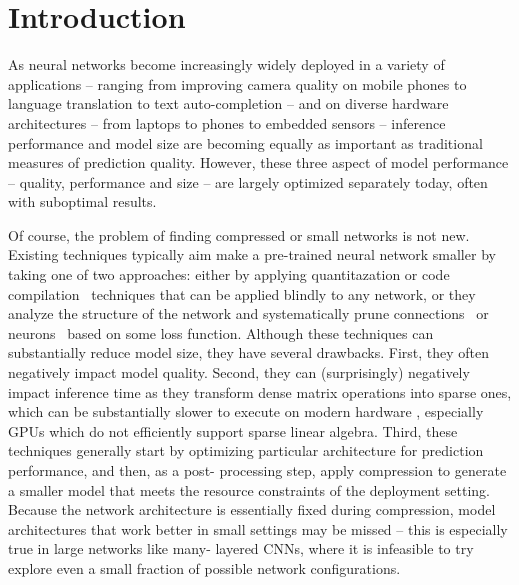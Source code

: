 
\section{Introduction}

As neural networks become increasingly widely deployed in a variety of
applications  -- ranging from improving camera quality on mobile phones
\cite{googleapple} to language translation \cite{languagetranslation} to text
auto-completion \cite{autocomplete} -- and on diverse hardware architectures
-- from laptops to phones to embedded sensors --  inference performance and
model size are becoming equally as important as  traditional measures of
prediction quality. However, these three aspect of model performance --
quality, performance and size -- are largely optimized separately today, often
with suboptimal results.

Of course, the problem of finding compressed or small networks is not new.
Existing techniques typically aim make a pre-trained neural network smaller
\cite{something1,something2} by taking one of two approaches:  either by
applying quantitazation \cite{quant} or code compilation~\cite{something}
techniques that can be applied blindly to any network, or they analyze the
structure of the network and systematically prune
connections~\cite{han2015deepcompression,Cun} or neurons~\cite{XXX}
based on some loss function.  Although these techniques can substantially
reduce model size, they have several drawbacks.  First, they often negatively
impact model quality.  Second, they can (surprisingly) negatively impact
inference time as they transform dense matrix operations into sparse ones,
which can be substantially slower to execute on modern hardware
\cite{something}, especially GPUs which do not efficiently support sparse
linear algebra.  Third, these techniques generally start by optimizing
particular architecture for prediction performance, and then, as a post-
processing step, apply compression  to generate a smaller model that meets the
resource constraints of the   deployment setting.  Because the network
architecture is essentially fixed during compression,   model architectures
that work better in small settings may be missed -- this is especially true in
large networks like many- layered CNNs,  where it is infeasible to try explore
even a small fraction of possible network configurations.


